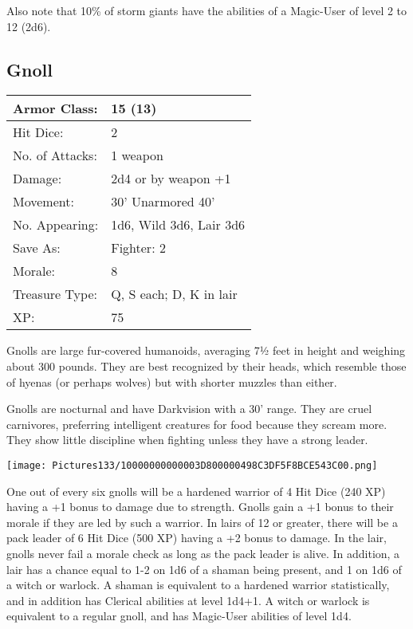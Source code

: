 \documentclass[a4paper,twoside,openany,10pt]{book}
\begin{document}
\begin{multicols}{2}
Also note that 10\% of storm giants have the abilities of a Magic-User of level 2 to 12 (2d6).


\subsection*{Gnoll}\label{gnoll}

\begin{tabularx}{0.48\textwidth}{@{}lX@{}}
Armor Class: & 15 (13) \\\hline
Hit Dice: & 2 \\\hline
No. of Attacks: & 1 weapon \\\hline
Damage: & 2d4 or by weapon +1 \\\hline
Movement: & 30' Unarmored 40' \\\hline
No. Appearing: & 1d6, Wild 3d6, Lair 3d6 \\\hline
Save As: & Fighter: 2 \\\hline
Morale: & 8 \\\hline
Treasure Type: & Q, S each; D, K in lair \\\hline
XP: & 75 \\\hline
\end{tabularx}\medskip

Gnolls are large fur-covered humanoids, averaging 7½ feet in height and weighing about 300 pounds. They are best recognized by their heads, which resemble those of hyenas (or perhaps wolves) but with shorter muzzles than either.

Gnolls are nocturnal and have Darkvision with a 30' range. They are cruel carnivores, preferring intelligent creatures for food because they scream more. They show little discipline when fighting unless they have a strong leader.


\begin{center}
	\texttt{[image: Pictures133/10000000000003D800000498C3DF5F8BCE543C00.png]}
\end{center}


One out of every six gnolls will be a hardened warrior of 4 Hit Dice (240 XP) having a +1 bonus to damage due to strength. Gnolls gain a +1 bonus to their morale if they are led by such a warrior. In lairs of 12 or greater, there will be a pack leader of 6 Hit Dice (500 XP) having a +2 bonus to damage. In the lair, gnolls never fail a morale check as long as the pack leader is alive. In addition, a lair has a chance equal to 1-2 on 1d6 of a shaman being present, and 1 on 1d6 of a witch or warlock. A shaman is equivalent to a hardened warrior statistically, and in addition has Clerical abilities at level 1d4+1. A witch or warlock is equivalent to a regular gnoll, and has Magic-User abilities of level 1d4.


\end{multicols}
\end{document}
